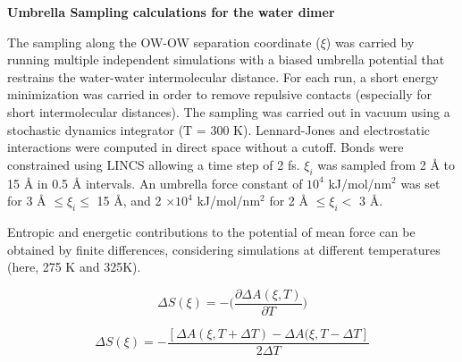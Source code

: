 \documentclass{achemso}
\begin{document}
\clearpage

\begin{center}
  \textbf{\large{Umbrella Sampling calculations for the water dimer}}
\end{center}

  The sampling along the OW-OW separation coordinate ($\xi$) was carried by running multiple
  independent simulations with a biased umbrella potential that restrains the
  water-water intermolecular distance. For each run, a short energy minimization
  was carried in order to remove repulsive contacts (especially for short
  intermolecular distances). The sampling was carried out in vacuum using a stochastic 
  dynamics integrator (T = 300 K). Lennard-Jones and electrostatic interactions were 
  computed in direct space without a cutoff. Bonds were constrained using LINCS allowing 
  a time step of 2 fs. $\xi_{i}$ was sampled from {2 \AA} to {15 \AA} in {0.5
  \AA} intervals. An umbrella force constant of $10^{4}$ kJ/mol/nm$^{2}$
  was set for {3 \AA} $\leq \xi_{i} \leq$ {15 \AA}, and 2 $\times 10^{4}$ kJ/mol/nm$^{2}$
  for {2 \AA} $\leq \xi_{i} <$ {3 \AA}.

  Entropic and energetic contributions to the potential of mean force can be obtained by 
  finite differences, considering simulations at different
  temperatures (here, 275 K and 325K).

  $$ \Delta S(\xi) = - \Bigg( \dfrac{\partial \Delta A (\xi , T)}{\partial T} \Bigg) $$

  $$ \Delta S(\xi) = - \dfrac{ [\Delta A (\xi , T+\Delta T) - \Delta A (\xi , T-\Delta T]}{2 \Delta T} $$


\clearpage
\end{document}
